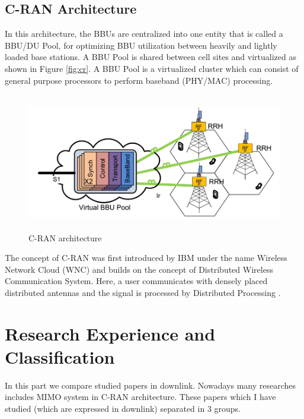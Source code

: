 \documentclass[journal,onecolumn,11pt,draftcls,doublespace]{IEEEtran}
\begin{document}
\subsection{C-RAN Architecture}
In this architecture, the BBUs are centralized into one entity that is called a BBU/DU Pool, for optimizing BBU utilization between
heavily and lightly loaded base stations.
A BBU Pool is shared between cell sites and virtualized as
shown in Figure \eqref{fig:cr}. A BBU Pool is a virtualized cluster which
can consist of general purpose processors to perform baseband
(PHY/MAC) processing. 
\begin{figure}[H]
  \centering
    \includegraphics[width=0.5\linewidth, height=6cm]{cr}
  \caption{C-RAN architecture \cite{369}}
  \label{fig:cr}
\end{figure}
The concept of C-RAN was first introduced by IBM 
under the name Wireless Network Cloud (WNC) and builds
on the concept of Distributed Wireless Communication System.
Here, a user communicates with densely placed distributed
antennas and the signal is processed by Distributed Processing \cite{369}.
\section{Research Experience and Classification}
In this part we compare studied papers in downlink.
Nowadays many researches includes MIMO system in C-RAN architecture.
These papers which I have studied (which are expressed in downlink) separated in 3 groups.
\end{document}

